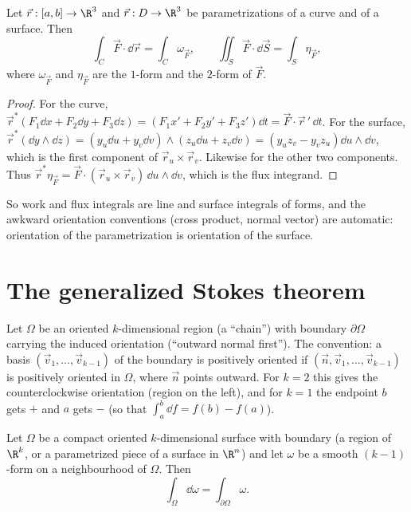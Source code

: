 \begin{theorem}\label{thm:oldint}
Let $\vec r:[a,b]\to\R^3$ and $\vec r:D\to\R^3$ be parametrizations of a curve and of a surface. Then
\[
\int_C\vec F\cdot\dd\vec r=\int_C\omega_{\vec F},\qquad\iint_S\vec F\cdot\dd\vec S=\int_S\eta_{\vec F},
\]
where $\omega_{\vec F}$ and $\eta_{\vec F}$ are the $1$-form and the $2$-form of $\vec F$.
\end{theorem}

\begin{proof}
For the curve, $\vec r^*(F_1\dd x+F_2\dd y+F_3\dd z)=(F_1x'+F_2y'+F_3z')\dd t=\vec F\cdot\vec r\,'\,\dd t$. For the surface, $\vec r^*(\dd y\wedge\dd z)=(y_u\dd u+y_v\dd v)\wedge(z_u\dd u+z_v\dd v)=(y_uz_v-y_vz_u)\dd u\wedge\dd v$, which is the first component of $\vec r_u\times\vec r_v$. Likewise for the other two components. Thus $\vec r^*\eta_{\vec F}=\vec F\cdot(\vec r_u\times\vec r_v)\,\dd u\wedge\dd v$, which is the flux integrand.
\end{proof}

So work and flux integrals are line and surface integrals of forms, and the awkward orientation conventions (cross product, normal vector) are automatic: orientation of the parametrization is orientation of the surface.

\section{The generalized Stokes theorem}

Let $\Omega$ be an oriented $k$-dimensional region (a ``chain'') with boundary $\partial\Omega$ carrying the induced orientation (``outward normal first''). The convention: a basis $(\vec v_1,\dots,\vec v_{k-1})$ of the boundary is positively oriented if $(\vec n,\vec v_1,\dots,\vec v_{k-1})$ is positively oriented in $\Omega$, where $\vec n$ points outward. For $k=2$ this gives the counterclockwise orientation (region on the left), and for $k=1$ the endpoint $b$ gets $+$ and $a$ gets $-$ (so that $\int_a^b\dd f=f(b)-f(a)$).

\begin{theorem}\label{thm:genstokes}
Let $\Omega$ be a compact oriented $k$-dimensional surface with boundary (a region of $\R^k$, or a parametrized piece of a surface in $\R^n$) and let $\omega$ be a smooth $(k-1)$-form on a neighbourhood of $\Omega$. Then
\[
\int_\Omega\dd\omega=\int_{\partial\Omega}\omega .
\]
\end{theorem}

